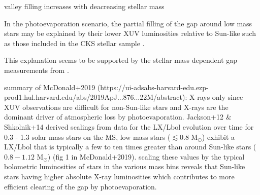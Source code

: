 \documentclass[twocolumn]{emulateapj}
\begin{document}
valley filling increases with deacreasing stellar mass  

In the photoevaporation scenario, the
partial filling of the gap around low mass stars may be explained by their lower XUV luminosities relative to 
Sun-like such as those included in the CKS stellar sample \citep{}.

This explanation seems to be supported by the stellar mass dependent gap measurements from \cite{fulton18}. 

summary of McDonald+2019 (https://ui-adsabs-harvard-edu.ezp-prod1.hul.harvard.edu/abs/2019ApJ...876...22M/abstract):
X-rays only since XUV observations are difficult for non-Sun-like stars and X-rays are the dominant driver of 
atmospheric loss by photoevaporation. 
Jackson+12 \& Shkolnik+14 derived scalings from data for the LX/Lbol evolution over time for 0.3 - 1.3 solar mass stars
on the MS, low mass stars ($\lesssim 0.8$ M$_{\odot}$) exhibit a LX/Lbol that is typically a few to ten times greater 
than around Sun-like stars ($0.8-1.12$ M$_{\odot}$) (fig 1 in McDonald+2019).
scaling these values by the typical bolometric luminosities of stars in the various mass bins reveals that 
Sun-like stars having higher absolute X-ray luminosities which contributes to more efficient clearing of the 
gap by photoevaporation.





\end{document}
